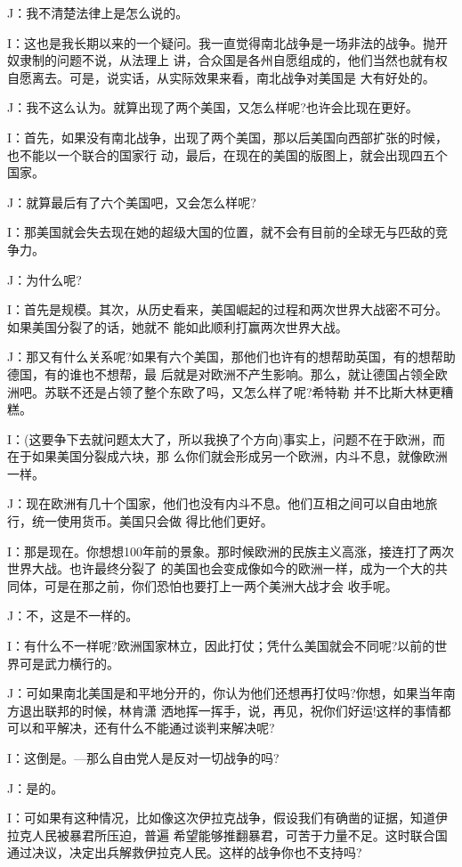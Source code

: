 ﻿\documentclass[11pt]{article}
\begin{document}
J：我不清楚法律上是怎么说的。

I：这也是我长期以来的一个疑问。我一直觉得南北战争是一场非法的战争。抛开奴隶制的问题不说，从法理上
讲，合众国是各州自愿组成的，他们当然也就有权自愿离去。可是，说实话，从实际效果来看，南北战争对美国是
大有好处的。

J：我不这么认为。就算出现了两个美国，又怎么样呢?也许会比现在更好。

I：首先，如果没有南北战争，出现了两个美国，那以后美国向西部扩张的时候，也不能以一个联合的国家行
动，最后，在现在的美国的版图上，就会出现四五个国家。

J：就算最后有了六个美国吧，又会怎么样呢?

I：那美国就会失去现在她的超级大国的位置，就不会有目前的全球无与匹敌的竞争力。

J：为什么呢?

I：首先是规模。其次，从历史看来，美国崛起的过程和两次世界大战密不可分。如果美国分裂了的话，她就不
能如此顺利打赢两次世界大战。

J：那又有什么关系呢?如果有六个美国，那他们也许有的想帮助英国，有的想帮助德国，有的谁也不想帮，最
后就是对欧洲不产生影响。那么，就让德国占领全欧洲吧。苏联不还是占领了整个东欧了吗，又怎么样了呢?希特勒
并不比斯大林更糟糕。

I：(这要争下去就问题太大了，所以我换了个方向)事实上，问题不在于欧洲，而在于如果美国分裂成六块，那
么你们就会形成另一个欧洲，内斗不息，就像欧洲一样。

J：现在欧洲有几十个国家，他们也没有内斗不息。他们互相之间可以自由地旅行，统一使用货币。美国只会做
得比他们更好。

I：那是现在。你想想100年前的景象。那时候欧洲的民族主义高涨，接连打了两次世界大战。也许最终分裂了
的美国也会变成像如今的欧洲一样，成为一个大的共同体，可是在那之前，你们恐怕也要打上一两个美洲大战才会
收手呢。

J：不，这是不一样的。

I：有什么不一样呢?欧洲国家林立，因此打仗；凭什么美国就会不同呢?以前的世界可是武力横行的。

J：可如果南北美国是和平地分开的，你认为他们还想再打仗吗?你想，如果当年南方退出联邦的时候，林肯潇
洒地挥一挥手，说，再见，祝你们好运!这样的事情都可以和平解决，还有什么不能通过谈判来解决呢?

I：这倒是。---那么自由党人是反对一切战争的吗?

J：是的。

I：可如果有这种情况，比如像这次伊拉克战争，假设我们有确凿的证据，知道伊拉克人民被暴君所压迫，普遍
希望能够推翻暴君，可苦于力量不足。这时联合国通过决议，决定出兵解救伊拉克人民。这样的战争你也不支持吗?
\end{document}
